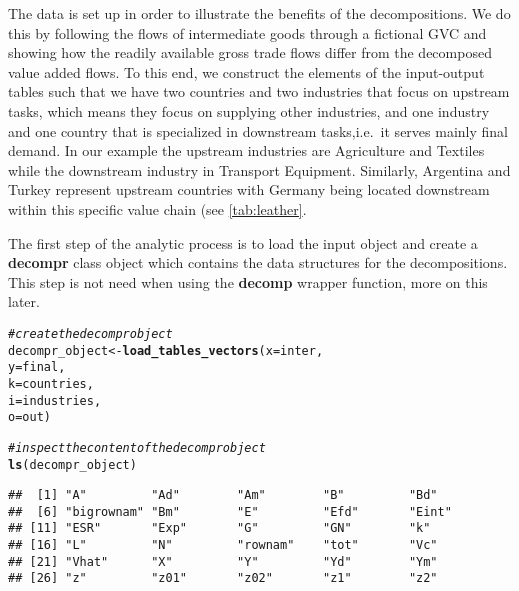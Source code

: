 \documentclass[a4paper]{article}\usepackage[]{graphicx}\usepackage[]{color}
\makeatletter
\newcommand{\hlcom}[1]{\textcolor[rgb]{0.678,0.584,0.686}{\textit{#1}}}%
\newcommand{\hlstd}[1]{\textcolor[rgb]{0.345,0.345,0.345}{#1}}%
\newcommand{\hlkwb}[1]{\textcolor[rgb]{0.69,0.353,0.396}{#1}}%
\newcommand{\hlkwc}[1]{\textcolor[rgb]{0.333,0.667,0.333}{#1}}%
\newcommand{\hlkwd}[1]{\textcolor[rgb]{0.737,0.353,0.396}{\textbf{#1}}}%
\newenvironment{kframe}{%
 \def\at@end@of@kframe{}%
 \ifinner\ifhmode%
  \def\at@end@of@kframe{\end{minipage}}%
  \begin{minipage}{\columnwidth}%
 \fi\fi%
 \def\FrameCommand##1{\hskip\@totalleftmargin \hskip-\fboxsep
 \colorbox{shadecolor}{##1}\hskip-\fboxsep
     \hskip-\linewidth \hskip-\@totalleftmargin \hskip\columnwidth}%
 \MakeFramed {\advance\hsize-\width
   \@totalleftmargin\z@ \linewidth\hsize
   \@setminipage}}%
 {\par\unskip\endMakeFramed%
 \at@end@of@kframe}
\newenvironment{knitrout}{}{} %
\makeatother
\begin{document}
The data is set up in order to illustrate the benefits of the decompositions.
We do this by following the flows of intermediate goods through a fictional GVC and showing how the readily available gross trade flows differ from the decomposed value added flows.
To this end, we construct the elements of the input-output tables such that we have two countries and two industries that focus on upstream tasks, which means they focus on supplying other industries, and one industry and one country that is specialized in downstream tasks,i.e.~it serves mainly final demand.
In our example the upstream industries are Agriculture and Textiles while the downstream industry in Transport Equipment.
Similarly, Argentina and Turkey represent upstream countries with Germany being located downstream within this specific value chain (see \cref{tab:leather}.

The first step of the analytic process is to load the input object and create a \textbf{decompr} class object which contains the data structures for the decompositions.
This step is not need when using the \textbf{decomp} wrapper function, more on this later.

\begin{knitrout}
\color{fgcolor}\begin{kframe}
\begin{alltt}
\hlcom{# create the decompr object}
\hlstd{decompr_object} \hlkwb{<-} \hlkwd{load_tables_vectors}\hlstd{(} \hlkwc{x} \hlstd{= inter,}
                                       \hlkwc{y} \hlstd{= final,}
                                       \hlkwc{k} \hlstd{= countries,}
                                       \hlkwc{i} \hlstd{= industries,}
                                       \hlkwc{o} \hlstd{= out        )}

\hlcom{# inspect the content of the decompr object}
\hlkwd{ls}\hlstd{(decompr_object)}
\end{alltt}
\begin{verbatim}
##  [1] "A"         "Ad"        "Am"        "B"         "Bd"       
##  [6] "bigrownam" "Bm"        "E"         "Efd"       "Eint"     
## [11] "ESR"       "Exp"       "G"         "GN"        "k"        
## [16] "L"         "N"         "rownam"    "tot"       "Vc"       
## [21] "Vhat"      "X"         "Y"         "Yd"        "Ym"       
## [26] "z"         "z01"       "z02"       "z1"        "z2"
\end{verbatim}
\end{kframe}
\end{knitrout}
\end{document}
